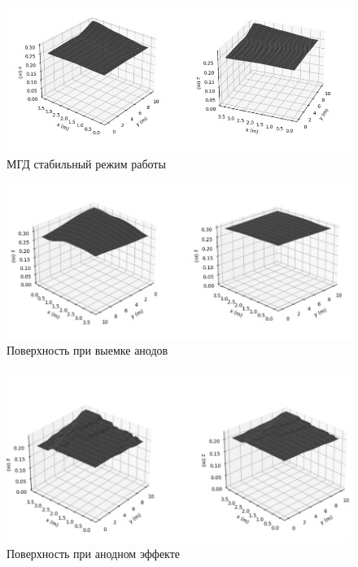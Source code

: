 \documentclass{article}
\begin{document}
\begin{figure}[H]
\hspace*{-4cm}\includegraphics[width=200mm]{спокойная поверхность.PNG}
\caption{МГД стабильный режим работы}
\end{figure}

\begin{figure}[H]
\hspace*{-4cm}\includegraphics[width=200mm]{Выемка анодов поверхность.PNG}
\caption{Поверхность при выемке анодов}
\end{figure}

\begin{figure}[H]
\hspace*{-4cm}\includegraphics[width=200mm]{Анодный эффект поверхность.PNG}
\caption{Поверхность при анодном эффекте}
\end{figure}
\end{document}
